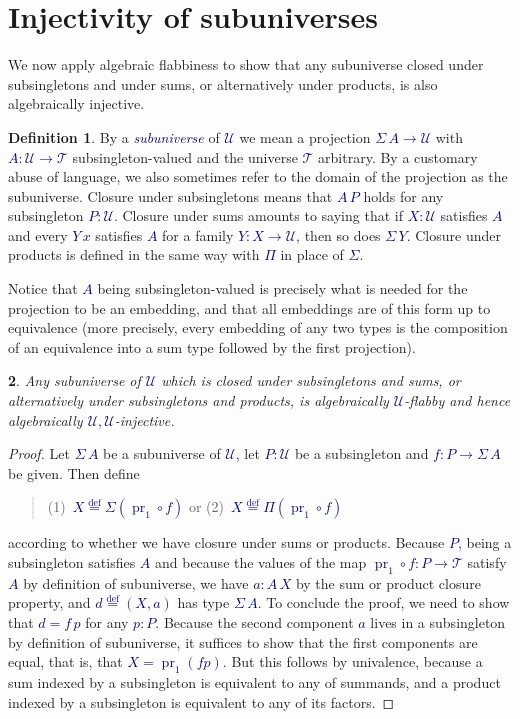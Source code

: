 \documentclass[10pt]{article}
\newcommand{\db}{\textcolor{darkblue}}
\newcommand{\df}[1]{\emph{\db{#1}}}
\newcommand{\m}[1]{\db{$#1$}}
\newcommand{\fst}{\operatorname{pr}_1}
\newcommand{\comp}{\mathrel{\circ}}
\newcommand{\U}{\mathcal{U}}
\newcommand{\T}{\mathcal{T}}
\newcommand{\eqdef}{\overset{\text{def}}{=}}
\newtheorem{numbered}{}
\theoremstyle{definition}
\newtheorem{definition}[numbered]{Definition}
\begin{document}
\section{Injectivity of subuniverses}

We now apply algebraic flabbiness to show that any subuniverse closed
under subsingletons and under sums, or alternatively under products,
is also algebraically injective.
\begin{definition}
  By a \df{subuniverse} of \m{\U} we mean a projection \m{\Sigma \, A
    \to \U} with \m{A : \U \to \T} subsingleton-valued and the
  universe \m{\T} arbitrary. By a customary abuse of language, we also
  sometimes refer to the domain of the projection as the
  subuniverse. Closure under subsingletons means that \m{A\,P} holds
  for any subsingleton \m{P:\U}. Closure under sums amounts to
  saying that if \m{X:\U} satisfies \m{A} and every \m{Y \, x}
  satisfies \m{A} for a family \m{Y : X \to \U}, then so does
  \m{\Sigma \, Y}. Closure under products is defined in the same way
  with \m{\Pi} in place of \m{\Sigma}.
\end{definition}
\noindent Notice that \m{A} being subsingleton-valued is
precisely what is needed for the projection to be an embedding, and
that all embeddings are of this form up to equivalence (more
precisely, every embedding of any two types is the composition of an
equivalence into a sum type followed by the first projection).

\begin{numbered}
  Any subuniverse of \m{\U} which is closed
  under subsingletons and sums, or alternatively under subsingletons and
  products, is algebraically \m{\U}-flabby and hence
  algebraically \m{\U,\U}-injective.
\end{numbered}
\begin{proof}
  Let \m{\Sigma\,A} be a subuniverse of \m{\U}, let \m{P:\U} be a
  subsingleton and \m{f : P \to \Sigma \, A} be given. Then define
  \begin{quote}
  (1)~\m{ X \eqdef \Sigma (\fst \comp f)} \qquad or \qquad (2)~\m{X \eqdef \Pi (\fst \comp f)}
  \end{quote}
  according to whether we have closure under sums or products. Because
  \m{P}, being a subsingleton satisfies \m{A} and because the values
  of the map \m{\fst \comp f : P \to \T} satisfy \m{A} by definition
  of subuniverse, we have \m{a : A\, X} by the sum or product closure
  property, and \m{d \eqdef (X,a)} has type \m{\Sigma \,A}. To
  conclude the proof, we need to show that \m{d = f\,p} for any
  \m{p:P}. Because the second component \m{a} lives in a subsingleton
  by definition of subuniverse, it suffices to show that the first
  components are equal, that is, that \m{X = \fst (f p)}. But this
  follows by univalence, because a sum indexed by a subsingleton is
  equivalent to any of summands, and a product indexed by a
  subsingleton is equivalent to any of its factors.
\end{proof}
\end{document}
